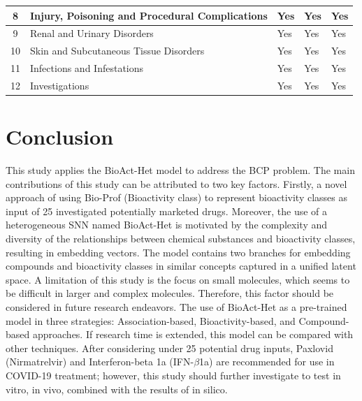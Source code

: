 \documentclass[conference]{IEEEtran}
\begin{document}
\begin{table}[h!]
\begin{tabular}{
    |c|>{\raggedright\arraybackslash}p{2.2cm}|
    >{\centering\arraybackslash}p{1.5cm}|
    >{\centering\arraybackslash}p{1.2cm}|
    >{\centering\arraybackslash}p{1.2cm}|}
    8            & Injury, Poisoning and Procedural Complications       & Yes                                                & Yes                              & Yes                         \\ \hline
    9            & Renal and Urinary Disorders                          & Yes                                                & Yes                              & Yes                         \\ \hline
    10           & Skin and Subcutaneous Tissue Disorders               & Yes                                                & Yes                              & Yes                         \\ \hline
    11           & Infections and Infestations                          & Yes                                                & Yes                              & Yes                         \\ \hline
    12           & Investigations                                       & Yes                                                & Yes                              & Yes                         \\ \hline
  \end{tabular}
\end{table}

\section{Conclusion}
This study applies the BioAct-Het model to address the BCP problem. The main contributions of this study can be attributed to two key factors. Firstly, a novel approach of using Bio-Prof (Bioactivity class) to represent bioactivity classes as input of 25 investigated potentially marketed drugs. Moreover, the use of a heterogeneous SNN named BioAct-Het is motivated by the complexity and diversity of the relationships between chemical substances and bioactivity classes, resulting in embedding vectors. The model contains two branches for embedding compounds and bioactivity classes in similar concepts captured in a unified latent space. A limitation of this study is the focus on small molecules, which seems to be difficult in larger and complex molecules. Therefore, this factor should be considered in future research endeavors. The use of BioAct-Het as a pre-trained model in three strategies: Association-based, Bioactivity-based, and Compound-based approaches. If research time is extended, this model can be compared with other techniques. After considering under 25 potential drug inputs, Paxlovid (Nirmatrelvir) and Interferon-beta 1a (IFN-$\beta$1a) are recommended for use in COVID-19 treatment; however, this study should further investigate to test in vitro, in vivo, combined with the results of in silico.
\end{document}
